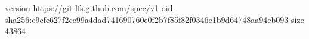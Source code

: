 version https://git-lfs.github.com/spec/v1
oid sha256:c9cfe627f2cc99a4dad741690760e0f2b7f85f82f0346e1b9d64748aa94cb093
size 43864

